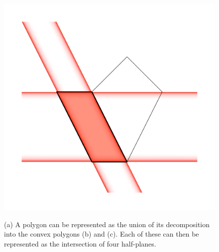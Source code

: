 \begin{figure}[tbp]
{\includegraphics[scale=0.16]{figs/halfspace-1}
\label{subfig:halfspace-intersection}}
\caption[A polygon represented as the union of two convex polygons]{(a) A polygon can be represented as the union of its decomposition into the convex polygons (b) and (c). Each of these can then be represented as the intersection of four half-planes.}
\label{fig:halfspace}
\end{figure}

